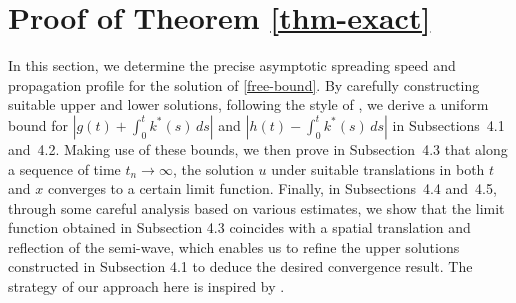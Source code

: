 \documentclass[11pt]{amsart}
\numberwithin{equation}{section}
\begin{document}
\section{Proof of Theorem \ref{thm-exact}}

In this section, we determine the precise asymptotic spreading speed and propagation profile for the solution of \eqref{free-bound}. 
By carefully constructing suitable upper and lower solutions, following the style of \cite{fife77}, we  derive a uniform bound for
\(|g(t) + \int_0^t k^*(s)\,ds|\) and \(|h(t) - \int_0^t k^*(s)\,ds|\) in Subsections~4.1 and~4.2.  
Making use of these bounds, we then prove  in Subsection~4.3 that along a sequence of time $t_n\to\infty$, the solution  \(u\) under suitable translations in both \(t\) and \(x\) converges to a certain limit function. 
Finally, in Subsections~4.4 and~4.5, through some careful analysis based on various estimates, we show that the limit function obtained in Subsection 4.3  coincides with  a spatial translation and reflection of the semi-wave, which enables us to refine the upper solutions constructed in Subsection 4.1 to deduce the desired convergence result. The strategy of our approach here is inspired by  \cite{DMZ,DMZ2, D}.
\end{document}
